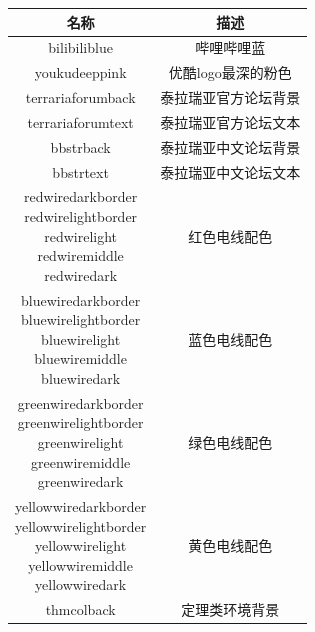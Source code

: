 \begin{longtable}{|c|c|}
\hline
名称                                             & 描述 \\\hline
\endhead
\textcolor{bilibiliblue}{bilibiliblue}           & 哔哩哔哩蓝 \\\hline
\textcolor{youkudeeppink}{youkudeeppink}         & 优酷logo最深的粉色 \\\hline
\textcolor{terrariaforumback}{terrariaforumback} & 泰拉瑞亚官方论坛背景 \\\hline
\textcolor{terrariaforumtext}{terrariaforumtext} & 泰拉瑞亚官方论坛文本 \\\hline
\textcolor{bbstrback}{bbstrback}                 & 泰拉瑞亚中文论坛背景 \\\hline
\textcolor{bbstrtext}{bbstrtext}                 & 泰拉瑞亚中文论坛文本 \\\hline
\makecell{
  \textcolor{redwiredarkborder}{redwiredarkborder} \\
  \textcolor{redwirelightborder}{redwirelightborder} \\
  \textcolor{redwirelight}{redwirelight} \\
  \textcolor{redwiremiddle}{redwiremiddle} \\
  \textcolor{redwiredark}{redwiredark}
}                                                & 红色电线配色 \\\hline
\makecell{
  \textcolor{bluewiredarkborder}{bluewiredarkborder} \\
  \textcolor{bluewirelightborder}{bluewirelightborder} \\
  \textcolor{bluewirelight}{bluewirelight} \\
  \textcolor{bluewiremiddle}{bluewiremiddle} \\
  \textcolor{bluewiredark}{bluewiredark}
}                                                & 蓝色电线配色 \\\hline
\makecell{
  \textcolor{greenwiredarkborder}{greenwiredarkborder} \\
  \textcolor{greenwirelightborder}{greenwirelightborder} \\
  \textcolor{greenwirelight}{greenwirelight} \\
  \textcolor{greenwiremiddle}{greenwiremiddle} \\
  \textcolor{greenwiredark}{greenwiredark}
}                                                & 绿色电线配色 \\\hline
\makecell{
  \textcolor{yellowwiredarkborder}{yellowwiredarkborder} \\
  \textcolor{yellowwirelightborder}{yellowwirelightborder} \\
  \textcolor{yellowwirelight}{yellowwirelight} \\
  \textcolor{yellowwiremiddle}{yellowwiremiddle} \\
  \textcolor{yellowwiredark}{yellowwiredark}
}                                                & 黄色电线配色 \\\hline
\textcolor{thmcolback}{thmcolback}               & 定理类环境背景 \\\hline
\end{longtable}
